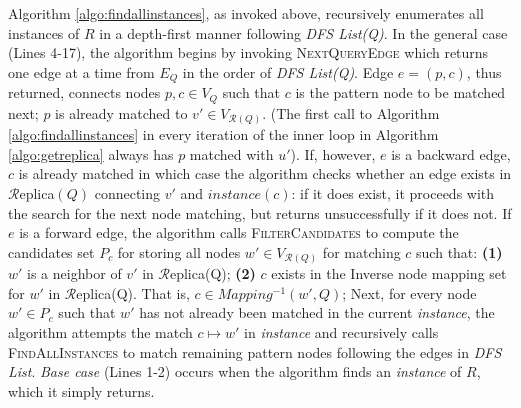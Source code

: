 Algorithm \ref{algo:findallinstances}, as invoked above, recursively enumerates all instances
of $R$ in a depth-first manner following \emph{DFS List(Q)}. In the general case (Lines 4-17), the algorithm
begins by invoking \textsc{NextQueryEdge} which returns one edge at a time from
$E_{Q}$ in the order of \emph{DFS List(Q)}. Edge $e=(p,c)$, thus returned, connects
nodes $p,c \in V_Q$ such that $c$ is the pattern node to be matched next; $p$ is already
matched to $v' \in V_{\mathcal{R}(Q)}$. (The first call to
Algorithm \ref{algo:findallinstances} in every iteration of the inner loop in
Algorithm \ref{algo:getreplica} always has $p$ matched with $u'$).
If, however, $e$ is a backward edge, $c$ is already matched in which case the
algorithm checks whether an edge exists in $\mathcal{R}$eplica$(Q)$
connecting $v'$ and $instance(c)$: if it does exist, it proceeds with the
search for the next node matching, but returns unsuccessfully if it does not. If
$e$ is a forward edge, the algorithm calls \textsc{FilterCandidates} to compute the candidates set $P_c$ for storing
all nodes $w'\in V_{\mathcal{R}(Q)}$ for matching $c$ such that:
\textbf{(1)} $w'$ is a neighbor of $v'$ in $\mathcal{R}$eplica(Q); \textbf{(2)}
$c$ exists in the Inverse node mapping set for $w'$ in $\mathcal{R}$eplica(Q). That
is,
$c\in Mapping^{-1}(w', Q)$;
Next, for every node $w' \in P_{c}$ such that $w'$ has not already been matched in the
current \textit{instance}, the algorithm attempts the match $c\mapsto w'$ in \textit{instance}
and recursively calls \textsc{FindAllInstances} to match
remaining pattern nodes following the edges in \textit{DFS List}. \textit{Base
case} (Lines 1-2) occurs when the algorithm finds an \textit{instance} of $R$,
which it simply returns.


